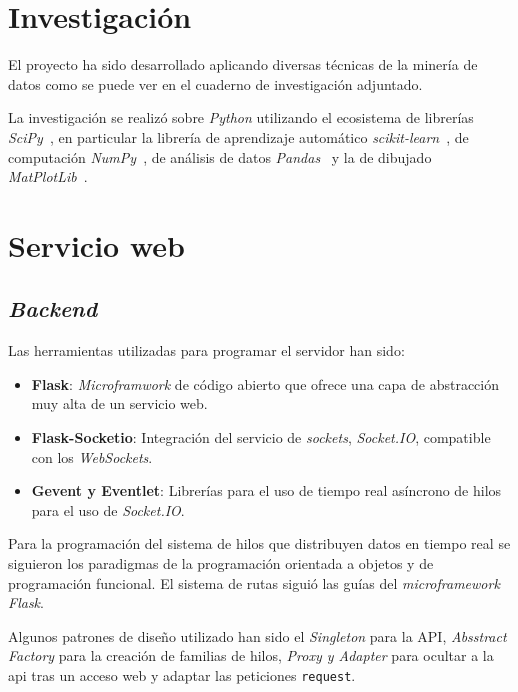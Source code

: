 
\section{Investigación}

El proyecto ha sido desarrollado aplicando diversas técnicas de la minería de datos como se puede ver en el cuaderno de investigación adjuntado.


La investigación se realizó sobre \textit{Python} utilizando el ecosistema de librerías \textit{SciPy}~\cite{tool:scipy}, en particular la librería de aprendizaje automático \textit{scikit-learn}~\cite{tool:scikit-learn}, de computación \textit{NumPy}~\cite{tool:numpy}, de análisis de datos \textit{Pandas}~\cite{tool:pandas} y la de dibujado \textit{MatPlotLib}~\cite{tool:matplotlib}.


\section{Servicio web}

\subsection{\textit{Backend}}

Las herramientas utilizadas para programar el servidor han sido:
\begin{itemize}
	\item \textbf{Flask}: \textit{Microframwork} de código abierto que ofrece una capa de abstracción muy alta de un servicio web.
	\item \textbf{Flask-Socketio}: Integración del servicio de \textit{sockets}, \textit{Socket.IO}, compatible con los \textit{WebSockets}.
	\item \textbf{Gevent y Eventlet}: Librerías para el uso de tiempo real asíncrono de hilos para el uso de \textit{Socket.IO}. 
\end{itemize}

Para la programación del sistema de hilos que distribuyen datos en tiempo real se siguieron los paradigmas de la programación orientada a objetos y de programación funcional. El sistema de rutas siguió las guías del \textit{microframework Flask}. 

Algunos patrones de diseño utilizado han sido el \textit{Singleton} para la API, \textit{Absstract Factory} para la creación de familias de hilos, \textit{Proxy y Adapter} para ocultar a la api tras un acceso web y adaptar las peticiones \texttt{request}.

